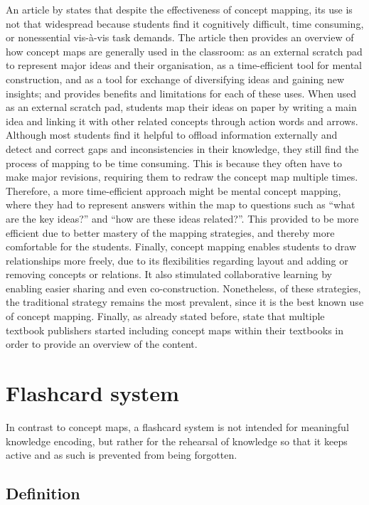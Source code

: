 An article by  states that despite the effectiveness of concept mapping, its use is not that widespread because students find it cognitively difficult, time consuming, or nonessential vis-\`{a}-vis task demands. The article then provides an overview of how concept maps are generally used in the classroom: as an external scratch pad to represent major ideas and their organisation, as a time-efficient tool for mental construction, and as a tool for exchange of diversifying ideas and gaining new insights; and provides benefits and limitations for each of these uses. When used as an external scratch pad, students map their ideas on paper by writing a main idea and linking it with other related concepts through action words and arrows. Although most students find it helpful to offload information externally and detect and correct gaps and inconsistencies in their knowledge, they still find the process of mapping to be time consuming. This is because they often have to make major revisions, requiring them to redraw the concept map multiple times. Therefore, a more time-efficient approach might be mental concept mapping, where they had to represent answers within the map to questions such as ``what are the key ideas?'' and ``how are these ideas related?''. This provided to be more efficient due to better mastery of the mapping strategies, and thereby more comfortable for the students. Finally, concept mapping enables students to draw relationships more freely, due to its flexibilities regarding layout and adding or removing concepts or relations. It also stimulated collaborative learning by enabling easier sharing and even co-construction. Nonetheless, of these strategies, the traditional strategy remains the most prevalent, since it is the best known use of concept mapping. Finally, as already stated before,  state that multiple textbook publishers started including concept maps within their textbooks in order to provide an overview of the content.

\section{Flashcard system}

In contrast to concept maps, a flashcard system is not intended for meaningful knowledge encoding, but rather for the rehearsal of knowledge so that it keeps active and as such is prevented from being forgotten.

\subsection{Definition}

